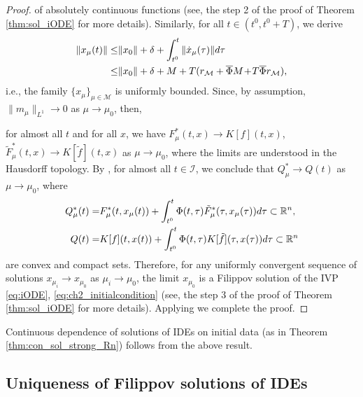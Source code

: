 \documentclass{article}
\newcommand{\R}{\mathbb{R}}
\begin{document}
\begin{proof}
of absolutely continuous functions (see, the step 2 of the proof of Theorem \ref{thm:sol_iODE} for more details).  Similarly, for all $t\in (t^0,t^0+T)$, we derive \vspace{-1mm}
\[\vspace{-1mm}
\begin{split}
\|x_{\mu}(t)\|\leq& \|x_0\|+\delta+\int^{t}_{t^0} \|\dot x_{\mu}(\tau)\| d\tau\\
\leq&  \|x_0\|+\delta+M +T (r_{\mathcal{M}}+\overline{\Phi}M\!+\!T\overline{\Phi} r_{\mathcal{M}}),
\end{split}
\]
i.e., the family $\{x_{\mu}\}_{\mu\in\mathcal{M}}$ is uniformly bounded.
 Since, by assumption, 
 $\|m_{\mu}\|_{L^1}\to 0$ as $\mu\to \mu_0$, then,
 
 for almost all $t$ and for all $x$, we have   $F^*_{\mu}(t,x)\to K[f](t,x)$, $\tilde F^*_{\mu}(t,x)\to K[\tilde f](t,x)$  as $\mu \to \mu_0$, where the limits are understood in the Hausdorff topology.
 By \cite[Theprem 5]{Aumann1965:JMAA}, for almost all $t\in \mathcal{I}$, we conclude that $Q^*_{\mu}\to Q(t)$ as $\mu\to \mu_{0}$,
where    \vspace{-1mm}
\[\vspace{-1mm}
\begin{split}
Q^*_{\mu}(t)=&F^*_{\mu}(t,x_{\mu}(t))+\int^t_{t^0} \Phi(t,\tau)\tilde F^{*}_{\mu}(\tau,x_{\mu}(\tau))d\tau\subset \R^n,\\
Q(t)=&K[f](t,x(t))+\int^t_{t^0} \Phi(t,\tau) K[\tilde f](\tau,x(\tau)) d\tau \subset \R^n
\end{split}
\]
are  convex and compact sets. Therefore,  for any uniformly convergent sequence of solutions $x_{\mu_i}\to x_{\mu_0}$ as $\mu_i\to \mu_0$, the limit $x_{\mu_0}$ is a Filippov solution of  the IVP \eqref{eq:iODE}, \eqref{eq:ch2_initialcondition}
(see, the step 3 of the proof of Theorem \ref{thm:sol_iODE} for more details).
Applying 
\cite[Lemma 6, page 10]{Filippov1988:Book} 
we complete the proof. 
\end{proof}

Continuous dependence of solutions  of IDEs on initial data (as in Theorem \ref{thm:con_sol_strong_Rn}) follows from the above result.




\vspace{-1mm}

\subsection{Uniqueness of Filippov  solutions of IDEs}
\end{document}
